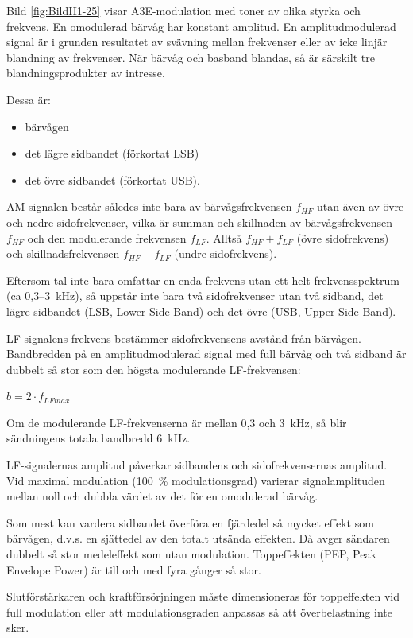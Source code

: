 Bild \ref{fig:BildII1-25} visar A3E-modulation med toner av olika styrka och
frekvens.
En omodulerad bärvåg har konstant amplitud.
En amplitudmodulerad signal är i grunden resultatet av svävning mellan
frekvenser eller av icke linjär blandning av frekvenser.
När bärvåg och basband blandas, så är särskilt tre blandningsprodukter av
intresse.

Dessa är:
\begin{itemize}
\item bärvågen
\item det lägre sidbandet (förkortat LSB)
\item det övre sidbandet (förkortat USB).
\end{itemize}

AM-signalen består således inte bara av bärvågsfrekvensen \(f_{HF}\) utan även
av övre och nedre sidofrekvenser, vilka är summan och skillnaden av
bärvågsfrekvensen \(f_{HF}\) och den modulerande frekvensen \(f_{LF}\).
Alltså \(f_{HF} + f_{LF}\) (övre sidofrekvens) och skillnadsfrekvensen
\(f_{HF} - f_{LF}\) (undre sidofrekvens).

Eftersom tal inte bara omfattar en enda frekvens utan ett helt frekvensspektrum
(ca 0,3--3~kHz), så uppstår inte bara två sidofrekvenser utan två sidband, det
lägre sidbandet (LSB, Lower Side Band) och det övre (USB, Upper Side Band).

LF-signalens frekvens bestämmer sidofrekvensens avstånd från bärvågen.
Bandbredden på en amplitudmodulerad signal med full bärvåg och två sidband är
dubbelt så stor som den högsta modulerande LF-frekvensen:

\(b= 2 \cdot f_{LFmax}\)

Om de modulerande LF-frekvenserna är mellan 0,3 och 3~kHz, så blir sändningens
totala bandbredd 6~kHz.

LF-signalernas amplitud påverkar sidbandens och sidofrekvensernas amplitud.
Vid maximal modulation (100~\% modulationsgrad) varierar signalamplituden mellan
noll och dubbla värdet av det för en omodulerad bärvåg.

Som mest kan vardera sidbandet överföra en fjärdedel så mycket effekt som
bärvågen, d.v.s. en sjättedel av den totalt utsända effekten.
Då avger sändaren dubbelt så stor medeleffekt som utan modulation.
Toppeffekten (PEP, Peak Envelope Power) är till och med fyra gånger så stor.

Slutförstärkaren och kraftförsörjningen måste dimensioneras för toppeffekten vid
full modulation eller att modulationsgraden anpassas så att överbelastning inte
sker.

